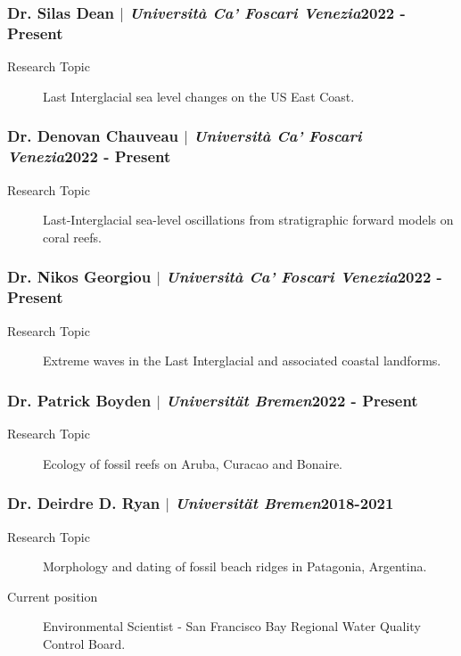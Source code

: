 \documentclass[11pt]{article}
\begin{document}
\subsubsection{Dr. Silas Dean $|$ {\normalfont\textit{Università Ca' Foscari Venezia}}\hfill 2022 - Present}
{\footnotesize 
\begin{description}
  \item [Research Topic] Last Interglacial sea level changes on the US East Coast. 
\end{description}
}
\smallskip
\subsubsection{Dr. Denovan Chauveau $|$ {\normalfont\textit{Università Ca' Foscari Venezia}}\hfill 2022 - Present}
{\footnotesize 
\begin{description}
  \item [Research Topic] Last-Interglacial sea-level oscillations from stratigraphic forward models on coral reefs. 
\end{description}
}

\smallskip
\subsubsection{Dr. Nikos Georgiou $|$ {\normalfont\textit{Università Ca' Foscari Venezia}}\hfill 2022 - Present}
{\footnotesize 
\begin{description}
  \item [Research Topic] Extreme waves in the Last Interglacial and associated coastal landforms. 
\end{description}
}
\smallskip
\subsubsection{Dr. Patrick Boyden $|$ {\normalfont\textit{Universität Bremen}}\hfill 2022 - Present}
{\footnotesize 
\begin{description}
  \item [Research Topic] Ecology of fossil reefs on Aruba, Curacao and Bonaire. 
\end{description}
}

\smallskip
\subsubsection{Dr. Deirdre D. Ryan $|$ {\normalfont\textit{Universität Bremen}}\hfill 2018-2021}
{\footnotesize 
\begin{description}
  \item [Research Topic] Morphology and dating of fossil beach ridges in Patagonia, Argentina. 
  \item [Current position] Environmental Scientist - San Francisco Bay Regional Water Quality Control Board. 
\end{description}
}
\end{document}
